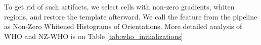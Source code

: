 \documentclass[10pt,twocolumn,letterpaper]{article}
\begin{document}
To get rid of such artifacts, we select cells with non-zero gradients, whiten regions, and restore the template afterward. We call the feature from the pipeline as Non-Zero Whitened Histograms of Orientations. More detailed analysis of WHO and NZ-WHO is on Table \ref{tab:who_initializations}





\end{document}
